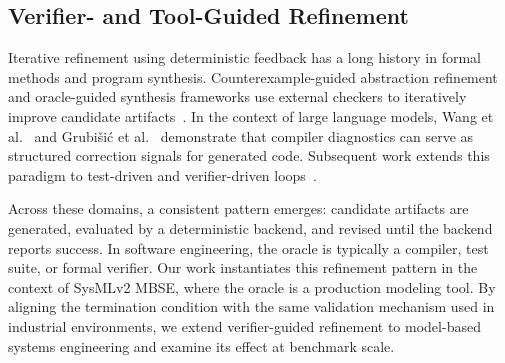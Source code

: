 \documentclass[colorlinks,upint,subscriptcorrection,varvw,hyphenate,balance]{asmeconf} %
\begin{document}
\subsection{Verifier- and Tool-Guided Refinement}

Iterative refinement using deterministic feedback has a long history in formal methods and program synthesis. Counterexample-guided abstraction refinement and oracle-guided synthesis frameworks use external checkers to iteratively improve candidate artifacts~\cite{clarke2000cegar,jha2010ogis,alur2013sygus}. In the context of large language models, Wang et al.~\cite{wang2022compilable} and Grubi{\v{s}}i{\'c} et al.~\cite{grubisic2024compiler} demonstrate that compiler diagnostics can serve as structured correction signals for generated code. Subsequent work extends this paradigm to test-driven and verifier-driven loops~\cite{ravi2025llmloop,sevenhuijsen2024vecogen,morvalho2025cegisprogramrepair,namin2024vermcts}.

Across these domains, a consistent pattern emerges: candidate artifacts are generated, evaluated by a deterministic backend, and revised until the backend reports success. In software engineering, the oracle is typically a compiler, test suite, or formal verifier. Our work instantiates this refinement pattern in the context of SysMLv2 MBSE, where the oracle is a production modeling tool. By aligning the termination condition with the same validation mechanism used in industrial environments, we extend verifier-guided refinement to model-based systems engineering and examine its effect at benchmark scale.



\end{document}
